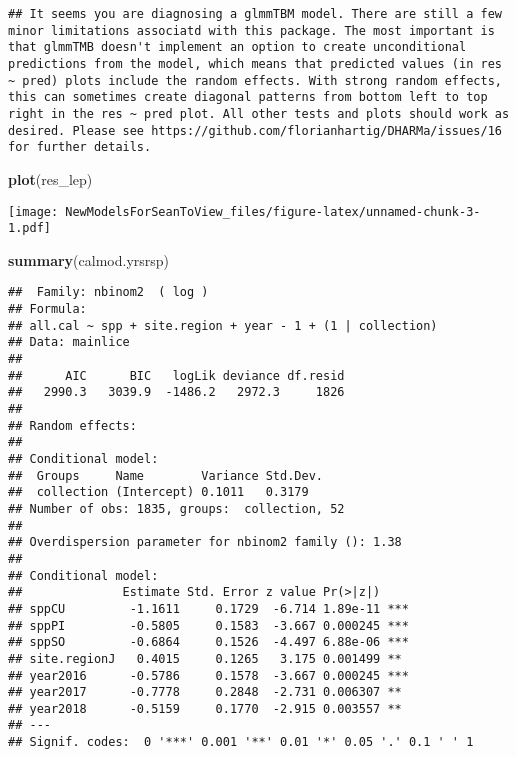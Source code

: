 \documentclass[]{article}
\newenvironment{Shaded}{\begin{snugshade}}{\end{snugshade}}
\newcommand{\KeywordTok}[1]{\textcolor[rgb]{0.13,0.29,0.53}{\textbf{#1}}}
\newcommand{\NormalTok}[1]{#1}
\begin{document}
\begin{verbatim}
## It seems you are diagnosing a glmmTBM model. There are still a few minor limitations associatd with this package. The most important is that glmmTMB doesn't implement an option to create unconditional predictions from the model, which means that predicted values (in res ~ pred) plots include the random effects. With strong random effects, this can sometimes create diagonal patterns from bottom left to top right in the res ~ pred plot. All other tests and plots should work as desired. Please see https://github.com/florianhartig/DHARMa/issues/16 for further details.
\end{verbatim}

\begin{Shaded}
\begin{Highlighting}[]
\KeywordTok{plot}\NormalTok{(res_lep)}
\end{Highlighting}
\end{Shaded}

\texttt{[image: NewModelsForSeanToView\_files/figure-latex/unnamed-chunk-3-1.pdf]}

\begin{Shaded}
\begin{Highlighting}[]
\KeywordTok{summary}\NormalTok{(calmod.yrsrsp)}
\end{Highlighting}
\end{Shaded}

\begin{verbatim}
##  Family: nbinom2  ( log )
## Formula:          
## all.cal ~ spp + site.region + year - 1 + (1 | collection)
## Data: mainlice
## 
##      AIC      BIC   logLik deviance df.resid 
##   2990.3   3039.9  -1486.2   2972.3     1826 
## 
## Random effects:
## 
## Conditional model:
##  Groups     Name        Variance Std.Dev.
##  collection (Intercept) 0.1011   0.3179  
## Number of obs: 1835, groups:  collection, 52
## 
## Overdispersion parameter for nbinom2 family (): 1.38 
## 
## Conditional model:
##              Estimate Std. Error z value Pr(>|z|)    
## sppCU         -1.1611     0.1729  -6.714 1.89e-11 ***
## sppPI         -0.5805     0.1583  -3.667 0.000245 ***
## sppSO         -0.6864     0.1526  -4.497 6.88e-06 ***
## site.regionJ   0.4015     0.1265   3.175 0.001499 ** 
## year2016      -0.5786     0.1578  -3.667 0.000245 ***
## year2017      -0.7778     0.2848  -2.731 0.006307 ** 
## year2018      -0.5159     0.1770  -2.915 0.003557 ** 
## ---
## Signif. codes:  0 '***' 0.001 '**' 0.01 '*' 0.05 '.' 0.1 ' ' 1
\end{verbatim}
\end{document}
